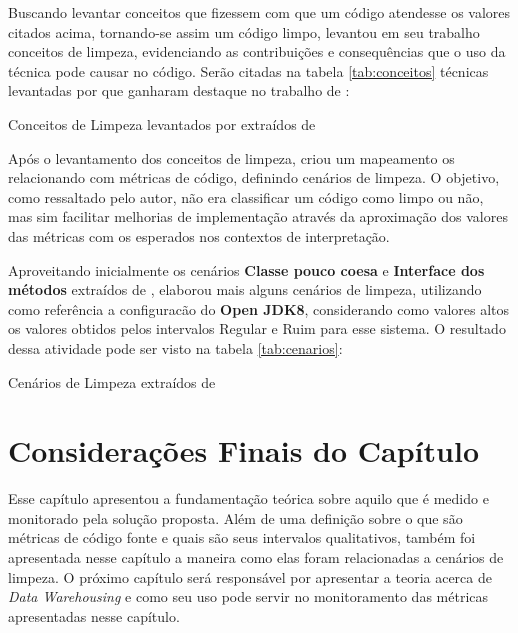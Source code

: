 Buscando levantar conceitos que fizessem com que um código atendesse os valores citados acima, tornando-se assim um código limpo,  levantou em seu trabalho conceitos de limpeza, evidenciando as contribuições e consequências que o uso da técnica pode causar no código. Serão citadas na tabela \ref{tab:conceitos} técnicas levantadas por  que ganharam destaque no trabalho de :

 \begin{table}[!ht]
\centering

\caption{Conceitos de Limpeza levantados por  extraídos de }
\label{tab:conceitos}
\end{table}
\FloatBarrier

Após o levantamento dos conceitos de limpeza,  criou um mapeamento os relacionando com métricas de código, definindo cenários de limpeza. O objetivo, como ressaltado pelo autor, não era classificar um código como limpo ou não, mas sim facilitar melhorias de implementação através da aproximação dos valores das métricas com os esperados nos contextos de interpretação.

Aproveitando inicialmente os cenários \textbf{Classe pouco coesa} e \textbf{Interface dos métodos} extraídos de  ,  elaborou mais alguns cenários de limpeza, utilizando como referência a configuracão do \textbf{Open JDK8}, considerando como valores altos os valores obtidos pelos intervalos  Regular e Ruim para esse sistema. O resultado dessa atividade pode ser visto na tabela \ref{tab:cenarios}:

\begin{table}
\begin{table}[H]
\centering

\caption{Cenários de Limpeza extraídos de }
\label{tab:cenarios}
\end{table}
\FloatBarrier
\end{table}  

\section{Considerações Finais do Capítulo}  

Esse capítulo apresentou a fundamentação teórica sobre aquilo que é medido e monitorado pela solução proposta. Além de uma definição sobre o que são métricas de código fonte e quais são seus intervalos qualitativos, também foi apresentada nesse capítulo a maneira como elas foram relacionadas a cenários de limpeza. O próximo capítulo será responsável por apresentar a teoria acerca de \textit{Data Warehousing} e como seu uso pode servir no monitoramento das métricas apresentadas nesse capítulo.